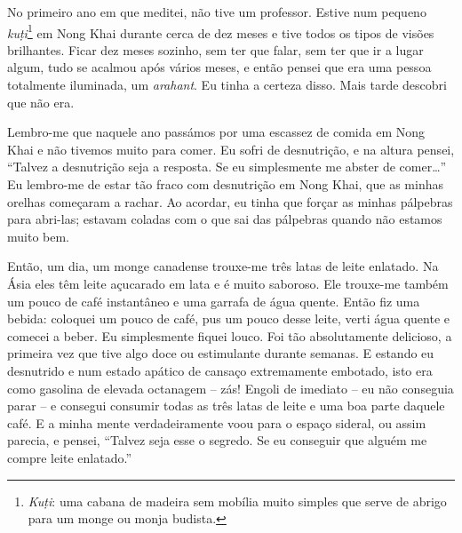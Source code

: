 No primeiro ano em que meditei, não tive um professor. Estive num pequeno
\emph{kuṭi}\footnote{\emph{Kuṭi}: uma cabana de madeira sem mobília muito
  simples que serve de abrigo para um monge ou monja budista.} em Nong Khai
durante cerca de dez meses e tive todos os tipos de visões brilhantes. Ficar dez
meses sozinho, sem ter que falar, sem ter que ir a lugar algum, tudo se acalmou
após vários meses, e então pensei que era uma pessoa totalmente iluminada, um
\emph{arahant}. Eu tinha a certeza disso. Mais tarde descobri que não era.

Lembro-me que naquele ano passámos por uma escassez de comida em Nong Khai e não
tivemos muito para comer. Eu sofri de desnutrição, e na altura pensei, ``Talvez
a desnutrição seja a resposta. Se eu simplesmente me abster de comer\ldots{}'' Eu
lembro-me de estar tão fraco com desnutrição em Nong Khai, que as minhas orelhas
começaram a rachar. Ao acordar, eu tinha que forçar as minhas pálpebras para
abri-las; estavam coladas com o que sai das pálpebras quando não estamos muito
bem.

Então, um dia, um monge canadense trouxe-me três latas de leite enlatado. Na
Ásia eles têm leite açucarado em lata e é muito saboroso. Ele trouxe-me também
um pouco de café instantâneo e uma garrafa de água quente. Então fiz uma bebida:
coloquei um pouco de café, pus um pouco desse leite, verti água quente e comecei
a beber. Eu simplesmente fiquei louco. Foi tão absolutamente delicioso, a
primeira vez que tive algo doce ou estimulante durante semanas. E estando eu
desnutrido e num estado apático de cansaço extremamente embotado, isto era como
gasolina de elevada octanagem -- zás! Engoli de imediato -- eu não conseguia
parar -- e consegui consumir todas as três latas de leite e uma boa parte
daquele café. E a minha mente verdadeiramente voou para o espaço sideral, ou
assim parecia, e pensei, ``Talvez seja esse o segredo. Se eu conseguir que
alguém me compre leite enlatado.''

